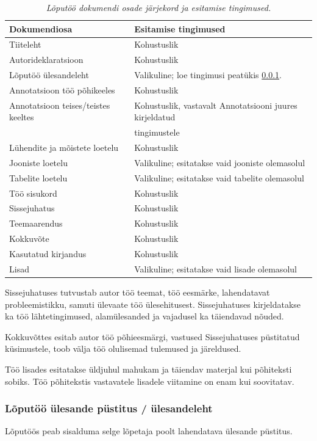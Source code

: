 \documentclass[12pt]{article} %
\begin{document}
\begin{table}
\caption{\it{Lõputöö dokumendi osade järjekord ja esitamise tingimused.}}
\label{tabel_lõputöö_osad}
\begin{tabular}{|l|l|} \hline
\textbf{Dokumendiosa} & \textbf{Esitamise tingimused} \\ \hline	
Tiiteleht & Kohustuslik \\ \hline
Autorideklaratsioon & Kohustuslik \\ \hline
Lõputöö ülesandeleht & Valikuline; loe tingimusi peatükis \ref{Lõputöö ülesande püstitus / ülesandeleht}. \\ \hline
Annotatsioon töö põhikeeles & Kohustuslik \\ \hline
Annotatsioon teises/teistes keeltes & Kohustuslik, vastavalt Annotatsiooni juures  kirjeldatud\\
& tingimustele \\ \hline
Lühendite ja mõistete loetelu & Kohustuslik \\ \hline
Jooniste loetelu & Valikuline; esitatakse vaid jooniste olemasolul \\ \hline
Tabelite loetelu & Valikuline; esitatakse vaid tabelite olemasolul \\ \hline
Töö sisukord & Kohustuslik \\ \hline
Sissejuhatus & Kohustuslik \\ \hline
Teemaarendus & Kohustuslik \\ \hline
Kokkuvõte & Kohustuslik \\ \hline
Kasutatud kirjandus & Kohustuslik \\ \hline
Lisad & Valikuline; esitatakse vaid lisade olemasolul\\ \hline

\end{tabular}
\end{table}

Sissejuhatuses tutvustab autor töö teemat, töö eesmärke, lahendatavat probleemistikku, samuti ülevaate töö ülesehitusest. Sissejuhatuses kirjeldatakse ka töö lähtetingimused, alamülesanded ja vajadusel ka täiendavad nõuded.

Kokkuvõttes esitab autor töö põhieesmärgi, vastused Sissejuhatuses püstitatud küsimustele, toob välja töö olulisemad tulemused ja järeldused. 

Töö lisades esitatakse üldjuhul mahukam ja täiendav materjal kui põhiteksti sobiks. Töö põhitekstis vastavatele lisadele viitamine on enam kui soovitatav.

\subsubsection{Lõputöö ülesande püstitus / ülesandeleht}
\label{Lõputöö ülesande püstitus / ülesandeleht} %
Lõputöös peab sisalduma selge lõpetaja poolt lahendatava ülesande püstitus.
\end{document}
